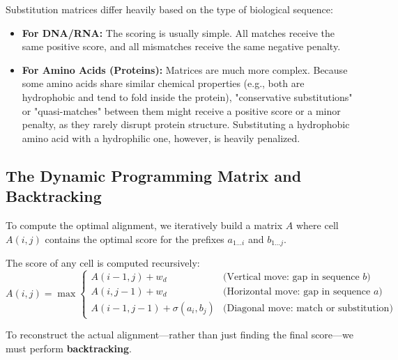 \documentclass[11pt,a4paper]{article}
\begin{document}
Substitution matrices differ heavily based on the type of biological sequence:
\begin{itemize}
    \item \textbf{For DNA/RNA:} The scoring is usually simple. All matches receive the same positive score, and all mismatches receive the same negative penalty.
    \item \textbf{For Amino Acids (Proteins):} Matrices are much more complex. Because some amino acids share similar chemical properties (e.g., both are hydrophobic and tend to fold inside the protein), "conservative substitutions" or "quasi-matches" between them might receive a positive score or a minor penalty, as they rarely disrupt protein structure. Substituting a hydrophobic amino acid with a hydrophilic one, however, is heavily penalized.
\end{itemize}

\subsection{The Dynamic Programming Matrix and Backtracking}
To compute the optimal alignment, we iteratively build a matrix \( A \) where cell \( A(i,j) \) contains the optimal score for the prefixes \( a_{1\dots i} \) and \( b_{1\dots j} \).

The score of any cell is computed recursively:
\[
A(i, j) = \max \begin{cases} 
A(i-1, j) + w_d & \text{(Vertical move: gap in sequence } b \text{)} \\
A(i, j-1) + w_d & \text{(Horizontal move: gap in sequence } a \text{)} \\
A(i-1, j-1) + \sigma(a_i, b_j) & \text{(Diagonal move: match or substitution)}
\end{cases}
\]

To reconstruct the actual alignment—rather than just finding the final score—we must perform \textbf{backtracking}.
\end{document}
